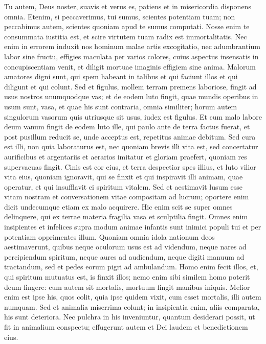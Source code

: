 \begin{biblechapter}  
\verse Tu autem, Deus noster, suavis et verus es, patiens et in misericordia disponens omnia. 
\verse Etenim, si peccaverimus, tui sumus, scientes potentiam tuam; non peccabimus autem, scientes quoniam apud te sumus computati. 
\verse Nosse enim te consummata iustitia est, et scire virtutem tuam radix est immortalitatis. 
\verse Nec enim in errorem induxit nos hominum malae artis excogitatio, nec adumbrantium labor sine fructu, effigies maculata per varios colores, 
\verse cuius aspectus insensatis in concupiscentiam venit, et diligit mortuae imaginis effigiem sine anima. 
\verse Malorum amatores digni sunt, qui spem habeant in talibus et qui faciunt illos et qui diligunt et qui colunt. 
\verse Sed et figulus, mollem terram premens laboriose, fingit ad usus nostros unumquodque vas; et de eodem luto fingit, quae mundis operibus in usum sunt, vasa, et quae his sunt contraria, omnia similiter; horum autem singulorum vasorum quis utriusque sit usus, iudex est figulus. 
\verse Et cum malo labore deum vanum fingit de eodem luto ille, qui paulo ante de terra factus fuerat, et post pusillum reducit se, unde acceptus est, repetitus animae debitum. 
\verse Sed cura est illi, non quia laboraturus est, nec quoniam brevis illi vita est, sed concertatur aurificibus et argentariis et aerarios imitatur et gloriam praefert, quoniam res supervacuas fingit. 
\verse Cinis est cor eius, et terra despectior spes illius, et luto vilior vita eius, 
\verse quoniam ignoravit, qui se finxit et qui inspiravit illi animam, quae operatur, et qui insufflavit ei spiritum vitalem. 
\verse Sed et aestimavit lusum esse vitam nostram et conversationem vitae compositam ad lucrum; oportere enim dicit undecumque etiam ex malo acquirere. 
\verse Hic enim scit se super omnes delinquere, qui ex terrae materia fragilia vasa et sculptilia fingit. 
\verse Omnes enim insipientes et infelices supra modum animae infantis sunt inimici populi tui et per potentiam opprimentes illum. 
\verse Quoniam omnia idola nationum deos aestimaverunt, quibus neque oculorum usus est ad videndum, neque nares ad percipiendum spiritum, neque aures ad audiendum, neque digiti manuum ad tractandum, sed et pedes eorum pigri ad ambulandum. 
\verse Homo enim fecit illos, et, qui spiritum mutuatus est, is finxit illos; nemo enim sibi similem homo poterit deum fingere: 
\verse cum autem sit mortalis, mortuum fingit manibus iniquis. Melior enim est ipse his, quos colit, quia ipse quidem vixit, cum esset mortalis, illi autem numquam. 
\verse Sed et animalia miserrima colunt; in insipientia enim, aliis comparata, his sunt deteriora. 
\verse Nec pulchra in his inveniuntur, quantum desiderari possit, ut fit in animalium conspectu; effugerunt autem et Dei laudem et benedictionem eius. 
\end{biblechapter}

